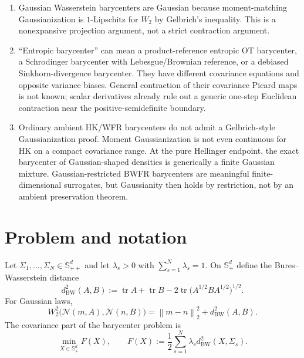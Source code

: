 \documentclass[11pt]{article}
\theoremstyle{definition}
\newcommand{\Splus}{\mathbb S_+^d}
\newcommand{\Spp}{\mathbb S_{++}^d}
\newcommand{\tr}{\operatorname{tr}}
\newcommand{\cN}{\mathcal N}
\newcommand{\norm}[1]{\left\lVert #1\right\rVert}
\begin{document}
\begin{enumerate}
  \item Gaussian Wasserstein barycenters are Gaussian because moment-matching
  Gaussianization is $1$-Lipschitz for $W_2$ by Gelbrich's inequality.  This is
  a nonexpansive projection argument, not a strict contraction argument.

  \item ``Entropic barycenter'' can mean a product-reference entropic OT
  barycenter, a Schrodinger barycenter with Lebesgue/Brownian reference, or a
  debiased Sinkhorn-divergence barycenter.  They have different covariance
  equations and opposite variance biases.  General contraction of their
  covariance Picard maps is not known; scalar derivatives already rule out a
  generic one-step Euclidean contraction near the positive-semidefinite
  boundary.

  \item Ordinary ambient HK/WFR barycenters do not admit a Gelbrich-style
  Gaussianization proof.  Moment Gaussianization is not even continuous for
  HK on a compact covariance range.  At the pure Hellinger endpoint, the exact
  barycenter of Gaussian-shaped densities is generically a finite Gaussian
  mixture.  Gaussian-restricted BWFR barycenters are meaningful finite-
  dimensional surrogates, but Gaussianity then holds by restriction, not by an
  ambient preservation theorem.
\end{enumerate}

\section{Problem and notation}

Let $\Sigma_1,\ldots,\Sigma_N\in\Spp$ and let
$\lambda_s>0$ with $\sum_{s=1}^N\lambda_s=1$.  On $\Splus$ define the
Bures--Wasserstein distance
\begin{equation}\label{eq:bures-distance}
 d_{\mathrm{BW}}^2(A,B)
 :=\tr A+\tr B-2\tr\bigl(A^{1/2}BA^{1/2}\bigr)^{1/2}.
\end{equation}
For Gaussian laws,
\begin{equation}\label{eq:gaussian-w2}
 W_2^2\bigl(\cN(m,A),\cN(n,B)\bigr)
 =\norm{m-n}_2^2+d_{\mathrm{BW}}^2(A,B).
\end{equation}
The covariance part of the barycenter problem is
\begin{equation}\label{eq:barycenter-objective}
 \min_{X\in\Splus} F(X),\qquad
 F(X):=\frac12\sum_{s=1}^N\lambda_s
 d_{\mathrm{BW}}^2(X,\Sigma_s).
\end{equation}
\end{document}

